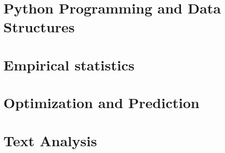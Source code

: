 \documentclass[titlepage]{tufte-book}
\newcommand{\cut}[1]{}
\begin{document}
\part{Python Programming and Data Structures}
 







\part{Empirical statistics}








\part{Optimization and Prediction}



\part{Text Analysis}


\cut{

}


\end{document}
